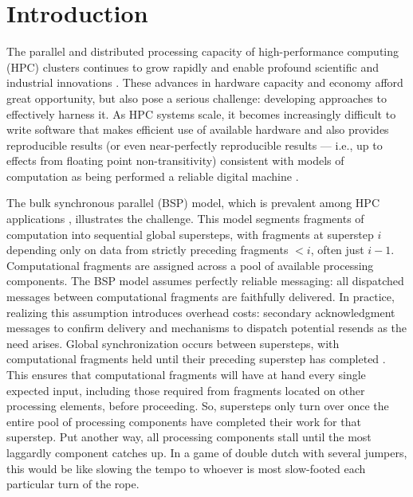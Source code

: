

\section{Introduction}
\label{sec:introoduction;ch:conduit}

The parallel and distributed processing capacity of high-performance computing (HPC) clusters continues to grow rapidly and enable profound scientific and industrial innovations \citep{gagliardi2019international}.
These advances in hardware capacity and economy afford great opportunity, but also pose a serious challenge: developing approaches to effectively harness it.
As HPC systems scale, it becomes increasingly difficult to write software that makes efficient use of available hardware and also provides reproducible results (or even near-perfectly reproducible results --- i.e., up to effects from floating point non-transitivity) consistent with models of computation as being performed a reliable digital machine \citep{heroux2014toward}.

The bulk synchronous parallel (BSP) model, which is prevalent among HPC applications \citep{dongarra2014applied}, illustrates the challenge.
This model segments fragments of computation into sequential global supersteps, with fragments at superstep $i$ depending only on data from strictly preceding fragments $<i$, often just $i-1$.
Computational fragments are assigned across a pool of available processing components.
The BSP model assumes perfectly reliable messaging: all dispatched messages between computational fragments are faithfully delivered.
In practice, realizing this assumption introduces overhead costs: secondary acknowledgment messages to confirm delivery and mechanisms to dispatch potential resends as the need arises.
Global synchronization occurs between supersteps, with computational fragments held until their preceding superstep has completed \citep{valiant1990bridging}.
This ensures that computational fragments will have at hand every single expected input, including those required from fragments located on other processing elements, before proceeding.
So, supersteps only turn over once the entire pool of processing components have completed their work for that superstep.
Put another way, all processing components stall until the most laggardly component catches up.
In a game of double dutch with several jumpers, this would be like slowing the tempo to whoever is most slow-footed each particular turn of the rope.

